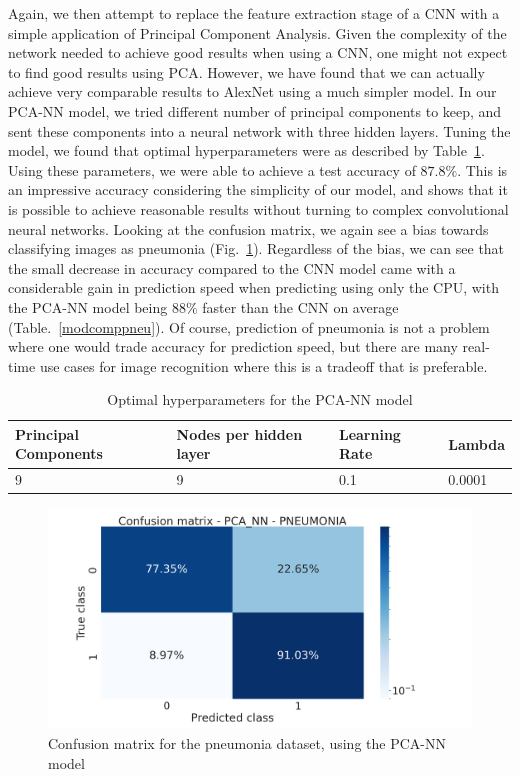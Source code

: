 \documentclass[onecolumn,10pt,cleanfoot]{asme2ej}
\begin{document}
Again, we then attempt to replace the feature extraction stage of a CNN with a simple application of Principal Component Analysis. Given the complexity of the network needed to achieve good results when using a CNN, one might not expect to find good results using PCA. However, we have found that we can actually achieve very comparable results to AlexNet using a much simpler model. In our PCA-NN model, we tried different number of principal components to keep, and sent these components into a neural network with three hidden layers. Tuning the model, we found that optimal hyperparameters were as described by Table~\ref{pcanntable}. Using these parameters, we were able to achieve a test accuracy of $87.8\%$. This is an impressive accuracy considering the simplicity of our model, and shows that it is possible to achieve reasonable results without turning to complex convolutional neural networks. Looking at the confusion matrix, we again see a bias towards classifying images as pneumonia (Fig.~\ref{conf_pca_nn_pneu}). Regardless of the bias, we can see that the small decrease in accuracy compared to the CNN model came with a considerable gain in prediction speed when predicting using only the CPU, with the PCA-NN model being $88\%$ faster than the CNN on average (Table.~\ref{modcomppneu}). Of course, prediction of pneumonia is not a problem where one would trade accuracy for prediction speed, but there are many real-time use cases for image recognition where this is a tradeoff that is preferable.

\begin{table}[H]
\caption{Optimal hyperparameters for the PCA-NN model}
\begin{center}
\label{pcanntable}
\begin{tabular}{| l | l | l | l |}
\hline
Principal Components & Nodes per hidden layer & Learning Rate & Lambda \\
\hline
9 & 9 & 0.1 & 0.0001 \\
\hline
\end{tabular}
\end{center}
\end{table}

\begin{figure}[H]
\centerline{\includegraphics[width=5in]{figure/conf_pca_nn_pneu.png}}
\caption{Confusion matrix for the pneumonia dataset, using the PCA-NN model}
\label{conf_pca_nn_pneu}
\end{figure}
\end{document}
